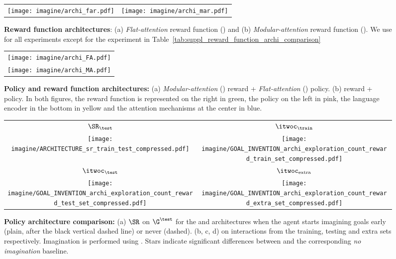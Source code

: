 \begin{figure*}[!h]
    \label{fig:reward_all_archi}
    \centering
    \begin{tabular}{cc}
    	\texttt{[image: imagine/archi\_far.pdf]} & \texttt{[image: imagine/archi\_mar.pdf]}
    \end{tabular}
    \caption{\textbf{Reward function architectures}: (a) \textit{Flat-attention} reward function (\far) and (b) \textit{Modular-attention} reward function (\mar). We use \mar for all experiments except for the experiment in Table~\ref{tab:suppl_reward_function_archi_comparison}
    \label{fig:archi_far_mar}}
\end{figure*}

\begin{figure*}[!h]
    \centering
    \begin{tabular}{c}
		\texttt{[image: imagine/archi\_FA.pdf]}\\
    	\texttt{[image: imagine/archi\_MA.pdf]}
    \end{tabular}

     \caption{\textbf{Policy and reward function architectures:} (a) \textit{Modular-attention} (\MA) reward + \textit{Flat-attention} (\FA) policy. (b) \MA reward + \MA policy. In both figures, the reward function is represented on the right in green, the policy on the left in pink, the language encoder in the bottom in yellow and the attention mechanisms at the center in blue.
    \label{fig:archi_FA_MA}}
\end{figure*}

\begin{figure}[!h]
    \centering
    \begin{tabular}{cc}
    	\textbf{$\SR_\test$} & \textbf{$\itwoc_\train$}\\
    	\texttt{[image: imagine/ARCHITECTURE\_sr\_train\_test\_compressed.pdf]} & \texttt{[image: imagine/GOAL\_INVENTION\_archi\_exploration\_count\_reward\_train\_set\_compressed.pdf]}
    	\\
	    \textbf{$\itwoc_\test$} & \textbf{$\itwoc_\text{extra}$}\\
    	\texttt{[image: imagine/GOAL\_INVENTION\_archi\_exploration\_count\_reward\_test\_set\_compressed.pdf]} & 
    	\texttt{[image: imagine/GOAL\_INVENTION\_archi\_exploration\_count\_reward\_extra\_set\_compressed.pdf]}\\
    \end{tabular}


    \caption{\textbf{Policy architecture comparison: } (a) $\SR$ on $\G^\test$ for the \FA and \MA architectures when the agent starts imagining goals early (plain, after the black vertical dashed line) or never (dashed). (b, c, d) \itwoc on interactions from the training, testing and extra sets respectively. Imagination is performed using \CGH. Stars indicate significant differences between \CGH and the corresponding \textit{no imagination} baseline.
    \label{fig:suppl_ma_fa_comparison}}
\end{figure}


